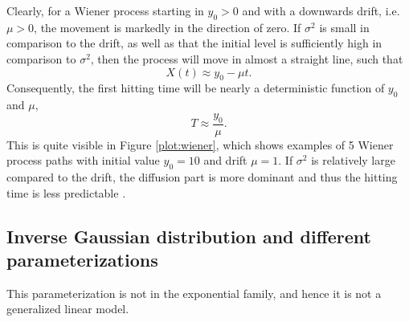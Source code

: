 \noindent{}Clearly, for a Wiener process starting in $y_0>0$ and with a downwards drift, i.e. $\mu>0$, the movement is markedly in the direction of zero. If $\sigma^2$ is small in comparison to the drift, as well as that the initial level is sufficiently high in comparison to $\sigma^2$, then the process will move in almost a straight line, such that
\begin{equation*}
    X(t)\approx y_0-\mu t.
\end{equation*}
Consequently, the first hitting time will be nearly a deterministic function of $y_0$ and $\mu$,
\begin{equation}
    T\approx \frac{y_0}{\mu}.
\end{equation}
This is quite visible in Figure \ref{plot:wiener}, which shows examples of 5 Wiener process paths with initial value $y_0=10$ and drift $\mu=1$. If $\sigma^2$ is relatively large compared to the drift, the diffusion part is more dominant and thus the hitting time is less predictable \citep{ABG}.

\subsection{Inverse Gaussian distribution and different parameterizations}
This parameterization is not in the exponential family, and hence it is not a generalized linear model.


